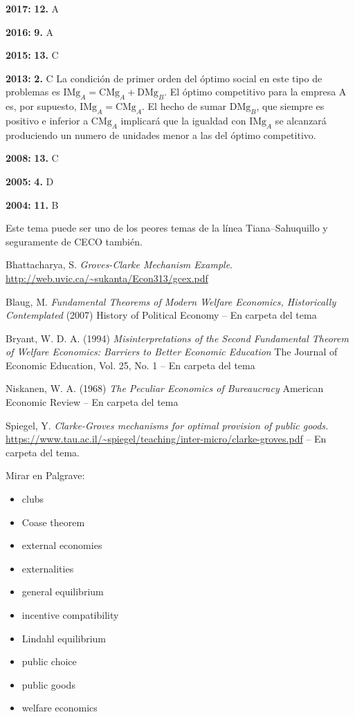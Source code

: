 \documentclass{nuevotema}
\begin{document}
\notas

\textbf{2017:} \textbf{12.} A

\textbf{2016:} \textbf{9.} A

\textbf{2015:} \textbf{13.} C

\textbf{2013:} \textbf{2.} C La condición de primer orden del óptimo social en este tipo de problemas es $\text{IMg}_A = \text{CMg}_A + \text{DMg}_B$. El óptimo competitivo para la empresa A es, por supuesto, $\text{IMg}_A = \text{CMg}_A$. El hecho de sumar $\text{DMg}_B$, que siempre es positivo e inferior a $\text{CMg}_A$ implicará que la igualdad con $\text{IMg}_A$ se alcanzará produciendo un numero de unidades menor a las del óptimo competitivo. 

\textbf{2008:} \textbf{13.} C

\textbf{2005:} \textbf{4.} D

\textbf{2004:} \textbf{11.} B


Este tema puede ser uno de los peores temas de la línea Tiana--Sahuquillo y seguramente de CECO también. 


\bibliografia

Bhattacharya, S. \textit{Groves-Clarke Mechanism Example}. \url{http://web.uvic.ca/~sukanta/Econ313/gcex.pdf}

Blaug, M. \textit{Fundamental Theorems of Modern Welfare Economics, Historically Contemplated} (2007) History of Political Economy -- En carpeta del tema

Bryant, W. D. A. (1994) \textit{Misinterpretations of the Second Fundamental Theorem of Welfare Economics: Barriers to Better Economic Education} The Journal of Economic Education, Vol. 25, No. 1 -- En carpeta del tema


Niskanen, W. A. (1968) \textit{The Peculiar Economics of Bureaucracy} American Economic Review -- En carpeta del tema

Spiegel, Y. \textit{Clarke-Groves mechanisms for optimal provision of public goods.} \url{https://www.tau.ac.il/~spiegel/teaching/inter-micro/clarke-groves.pdf} -- En carpeta del tema.

Mirar en Palgrave:
\begin{itemize} 
	\item clubs
	\item Coase theorem
	\item external economies
	\item externalities
	\item general equilibrium
	\item incentive compatibility
	\item Lindahl equilibrium
	\item public choice
	\item public goods
	\item welfare economics
\end{itemize}
\end{document}

